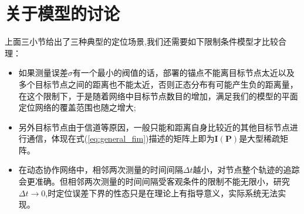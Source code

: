\section{关于模型的讨论}\label{section:model_discussion}
上面三小节给出了三种典型的定位场景,我们还需要如下限制条件模型才比较合理：
\begin{itemize}
  \item 如果测量误差$\sigma$有一个最小的阀值的话，部署的锚点不能离目标节点太近以及多个目标节点之间的距离也不能太近，否则正态分布有可能产生负的距离量，在这个限制下，于是随着网络中目标节点数目的增加，满足我们的模型的平面定位网络的覆盖范围也随之增大;
  \item 另外目标节点由于信道等原因，一般只能和距离自身比较近的其他目标节点进行通信，体现在式(\ref{eq:general_fim})描述的矩阵上即为$\bm{I}(\bm{P})$是大型稀疏矩阵。
  \item 在动态协作网络中，相邻两次测量的时间间隔$\Delta t$越小，对节点整个轨迹的追踪会更准确。但相邻两次测量的时间间隔受客观条件的限制不能无限小，研究$\Delta t \to 0$,时定位误差下界的性态只是在理论上有指导意义，实际系统无法实现。
\end{itemize}
